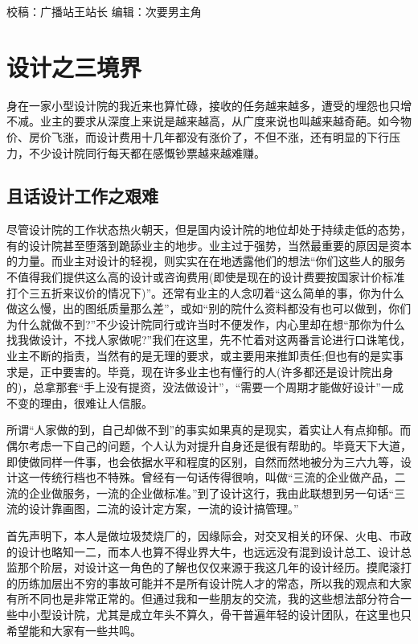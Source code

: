 \documentclass[
]{book}
\begin{document}
校稿：广播站王站长
编辑：次要男主角

\hypertarget{ux8bbeux8ba1ux4e4bux4e09ux5883ux754c}{%
\section{设计之三境界}\label{ux8bbeux8ba1ux4e4bux4e09ux5883ux754c}}

身在一家小型设计院的我近来也算忙碌，接收的任务越来越多，遭受的埋怨也只增不减。业主的要求从深度上来说是越来越高，从广度来说也叫越来越奇葩。如今物价、房价飞涨，而设计费用十几年都没有涨价了，不但不涨，还有明显的下行压力，不少设计院同行每天都在感慨钞票越来越难赚。

\hypertarget{ux4e14ux8bddux8bbeux8ba1ux5de5ux4f5cux4e4bux8270ux96be}{%
\subsection{且话设计工作之艰难}\label{ux4e14ux8bddux8bbeux8ba1ux5de5ux4f5cux4e4bux8270ux96be}}

尽管设计院的工作状态热火朝天，但是国内设计院的地位却处于持续走低的态势，有的设计院甚至堕落到跪舔业主的地步。业主过于强势，当然最重要的原因是资本的力量。而业主对设计的轻视，则实实在在地透露他们的想法``你们这些人的服务不值得我们提供这么高的设计或咨询费用(即使是现在的设计费要按国家计价标准打个三五折来议价的情况下)''。还常有业主的人念叨着``这么简单的事，你为什么做这么慢，出的图纸质量那么差''，或如``别的院什么资料都没有也可以做到，你们为什么就做不到?''不少设计院同行或许当时不便发作，内心里却在想``那你为什么找我做设计，不找人家做呢?''我们在这里，先不忙着对这两番言论进行口诛笔伐，业主不断的指责，当然有的是无理的要求，或主要用来推卸责任;但也有的是实事求是，正中要害的。毕竟，现在许多业主也有懂行的人(许多都还是设计院出身的)，总拿那套``手上没有提资，没法做设计''，``需要一个周期才能做好设计''一成不变的理由，很难让人信服。

所谓``人家做的到，自己却做不到''的事实如果真的是现实，着实让人有点抑郁。而偶尔考虑一下自己的问题，个人认为对提升自身还是很有帮助的。毕竟天下大道，即使做同样一件事，也会依据水平和程度的区别，自然而然地被分为三六九等，设计这一传统行档也不特殊。曾经有一句话传得很响，叫做``三流的企业做产品，二流的企业做服务，一流的企业做标准。''到了设计这行，我由此联想到另一句话``三流的设计靠画图，二流的设计定方案，一流的设计搞管理。''

首先声明下，本人是做垃圾焚烧厂的，因缘际会，对交叉相关的环保、火电、市政的设计也略知一二，而本人也算不得业界大牛，也远远没有混到设计总工、设计总监那个阶层，对设计这一角色的了解也仅仅来源于我这几年的设计经历。摸爬滚打的历练加层出不穷的事故可能并不是所有设计院人才的常态，所以我的观点和大家有所不同也是非常正常的。但通过我和一些朋友的交流，我的这些想法部分符合一些中小型设计院，尤其是成立年头不算久，骨干普遍年轻的设计团队，在这里也只希望能和大家有一些共鸣。
\end{document}
